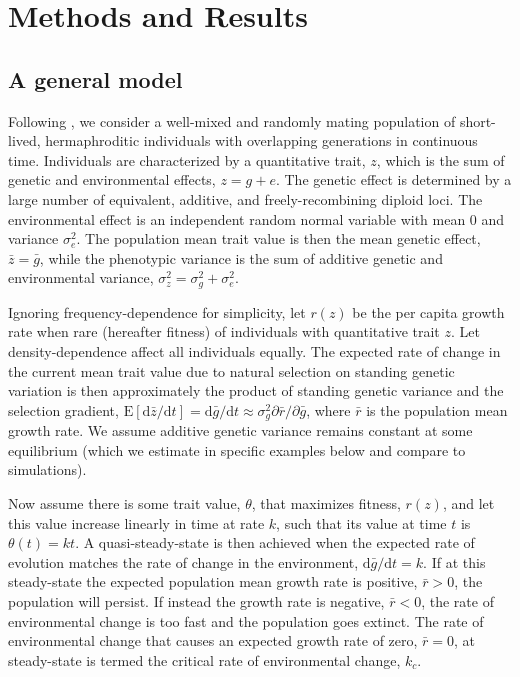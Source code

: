 \documentclass[12pt,letterpaper]{article} %
\begin{document}
\section*{Methods and Results}
\subsection*{A general model}

Following \cite{Lynch1993}, we consider a well-mixed and randomly mating population of short-lived, hermaphroditic individuals with overlapping generations in continuous time.
Individuals are characterized by a quantitative trait, $z$, which is the sum of genetic and environmental effects, $z = g + e$.
The genetic effect is determined by a large number of equivalent, additive, and freely-recombining diploid loci.
The environmental effect is an independent random normal variable with mean 0 and variance $\sigma_e^2$.
The population mean trait value is then the mean genetic effect, $\bar{z} = \bar{g}$, while the phenotypic variance is the sum of additive genetic and environmental variance, $\sigma_z^2 = \sigma_g^2 + \sigma_e^2$.

Ignoring frequency-dependence for simplicity, let $r(z)$ be the per capita growth rate when rare (hereafter fitness) of individuals with quantitative trait $z$.
Let density-dependence affect all individuals equally.
The expected rate of change in the current mean trait value due to natural selection on standing genetic variation is then approximately the product of standing genetic variance and the selection gradient, $\mathrm{E}[\mathrm{d}\bar{z}/\mathrm{d}t] = \mathrm{d}\bar{g}/\mathrm{d}t \approx \sigma_g^2 \partial \bar{r} / \partial \bar{g}$, where $\bar{r}$ is the population mean growth rate.
We assume additive genetic variance remains constant at some equilibrium (which we estimate in specific examples below and compare to simulations).

Now assume there is some trait value, $\theta$, that maximizes fitness, $r(z)$, and let this value increase linearly in time at rate $k$, such that its value at time $t$  is $\theta(t) = k t$. 
A quasi-steady-state is then achieved when the expected rate of evolution matches the rate of change in the environment, $\mathrm{d}\bar{g}/\mathrm{d}t = k$.
If at this steady-state the expected population mean growth rate is positive, $\bar{r} > 0$, the population will persist.
If instead the growth rate is negative, $\bar{r} < 0$, the rate of environmental change is too fast and the population goes extinct.
The rate of environmental change that causes an expected growth rate of zero, $\bar{r} =0$, at steady-state is termed the critical rate of environmental change, $k_c$. 
\end{document}
